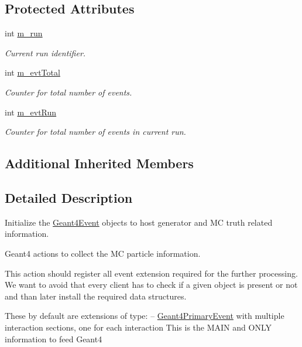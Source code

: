 \subsection*{Protected Attributes}
\begin{DoxyCompactItemize}
\item 
int \hyperlink{class_d_d4hep_1_1_simulation_1_1_geant4_generator_action_init_a251d29e869dd2401e208f39176cb6fe1}{m\+\_\+run}
\begin{DoxyCompactList}\small\item\em Current run identifier. \end{DoxyCompactList}\item 
int \hyperlink{class_d_d4hep_1_1_simulation_1_1_geant4_generator_action_init_a88579a131b4e22fa0b05f87fe1a8276c}{m\+\_\+evt\+Total}
\begin{DoxyCompactList}\small\item\em Counter for total number of events. \end{DoxyCompactList}\item 
int \hyperlink{class_d_d4hep_1_1_simulation_1_1_geant4_generator_action_init_a4d685bb901485377aa271474ed70969b}{m\+\_\+evt\+Run}
\begin{DoxyCompactList}\small\item\em Counter for total number of events in current run. \end{DoxyCompactList}\end{DoxyCompactItemize}
\subsection*{Additional Inherited Members}


\subsection{Detailed Description}
Initialize the \hyperlink{class_d_d4hep_1_1_simulation_1_1_geant4_event}{Geant4\+Event} objects to host generator and MC truth related information. 

Geant4 actions to collect the MC particle information.

This action should register all event extension required for the further processing. We want to avoid that every client has to check if a given object is present or not and than later install the required data structures.

These by default are extensions of type\+: -- \hyperlink{class_d_d4hep_1_1_simulation_1_1_geant4_primary_event}{Geant4\+Primary\+Event} with multiple interaction sections, one for each interaction This is the M\+A\+IN and O\+N\+LY information to feed Geant4

